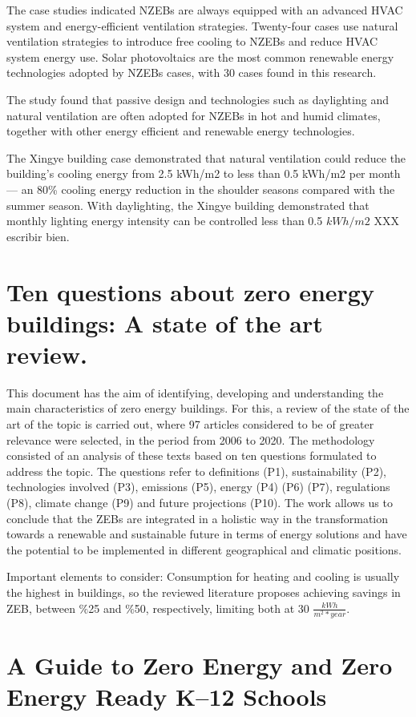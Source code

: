 The case studies indicated NZEBs are always equipped with an advanced HVAC system and energy-efficient ventilation strategies. Twenty-four cases use natural ventilation strategies to introduce free cooling to NZEBs and reduce HVAC system energy use. Solar photovoltaics are the most common renewable energy technologies adopted by NZEBs cases, with 30 cases found in this research.

The study found that passive design and technologies such as daylighting and natural ventilation are often adopted for NZEBs in hot and humid climates, together with other energy efficient and renewable energy technologies. 

The Xingye building case demonstrated that natural ventilation could reduce the building's cooling energy from 2.5 kWh/m2 to less than 0.5 kWh/m2 per month — an 80\% cooling energy reduction in the shoulder seasons compared with the summer season. With daylighting, the Xingye building demonstrated that monthly lighting energy intensity can be controlled less than 0.5 $kWh/m2$ XXX escribir bien.

\section{Ten questions about zero energy buildings: A state of the art review.}
This document has the aim of identifying, developing and understanding the main characteristics of zero energy buildings. For this, a review of the state of the art of the topic is carried out, where 97 articles considered to be of greater relevance were selected, in the period from 2006 to 2020. The methodology consisted of an analysis of these texts based on ten questions formulated to address the topic. The questions refer to definitions (P1), sustainability (P2), technologies involved (P3), emissions (P5), energy (P4) (P6) (P7), regulations (P8), climate change (P9) and future projections (P10). The work allows us to conclude that the ZEBs are integrated in a holistic way in the transformation towards a renewable and sustainable future in terms of energy solutions and have the potential to be implemented in different geographical and climatic positions.


Important elements to consider: Consumption for heating and cooling is usually the highest in buildings, so the reviewed literature proposes achieving savings in ZEB, between $\%$25 and $\%$50, respectively, limiting both at 30 $\frac{kWh}{m^{2}*year}$.


\section{A Guide to Zero Energy and Zero Energy Ready K–12 Schools}

